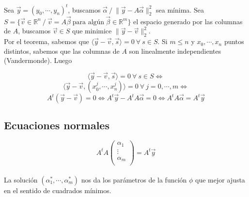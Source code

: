 Sea $\Vec{y} = (y_{0}, \cdots, y_{n})^{t}$, buscamos $\Vec{\alpha}\ / \ \|\Vec{y} - A\Vec{\alpha}\|_{2}^{2}$ sea m\'inima. Sea $S = \{\Vec{v} \in \mathbb{R}^{n}\ / \ \Vec{v} = A\Vec{\beta}\ \text{para alg\'un}\ \Vec{\beta} \in \mathbb{R}^{m}\}$ el espacio generado por las columnas de $A$, buscamos $\Vec{v} \in S$ que minimice $\|\Vec{y} - \Vec{v}\|_{2}^{2}$.\\

Por el teorema, sabemos que $\langle \Vec{y} - \Vec{v}, \Vec{s} \rangle = 0\ \forall \ s \in S$. Si $m \leq n$ y $x_{0}, \cdots, x_{n}$ puntos distintos, sabemos que las columnas de $A$ son linealmente independientes (Vandermonde). Luego

$$ \langle \Vec{y} - \Vec{v}, \Vec{s} \rangle = 0\ \forall \ s \in S \iff$$
$$\langle \Vec{y} - \Vec{v}, (x_{0}^{j}, \cdots, x_{n}^{j}) \rangle = 0\ \forall \ j = 0, \cdots, m \iff$$
$$A^{t}(\Vec{y} - \Vec{v}) = 0 \iff A^{t}\Vec{y} - A^{t}A\Vec{\alpha} = 0 \iff A^{t}A\Vec{\alpha} = A^{t}\Vec{y}$$

\subsection{Ecuaciones normales}

$$  A^{t}A
	\begin{pmatrix}
        \alpha_{1}\\
        \vdots\\
        \alpha_{m}\\
    \end{pmatrix}
    =
    A^{t}\Vec{y}
$$\\

La soluci\'on $(\alpha_{1}^{*}, \cdots, \alpha_{m}^{*})$ nos da los par\'ametros de la funci\'on $\phi$ que mejor ajusta en el sentido de cuadrados m\'inimos.\\

